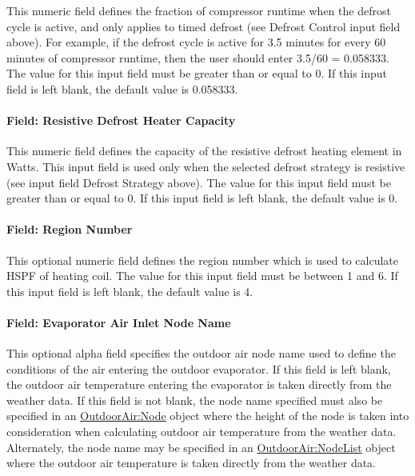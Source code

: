 This numeric field defines the fraction of compressor runtime when the defrost cycle is active, and only applies to timed defrost (see Defrost Control input field above). For example, if the defrost cycle is active for 3.5 minutes for every 60 minutes of compressor runtime, then the user should enter 3.5/60 = 0.058333. The value for this input field must be greater than or equal to 0. If this input field is left blank, the default value is 0.058333.

\paragraph{Field: Resistive Defrost Heater Capacity}\label{field-resistive-defrost-heater-capacity}

This numeric field defines the capacity of the resistive defrost heating element in Watts. This input field is used only when the selected defrost strategy is resistive (see input field Defrost Strategy above). The value for this input field must be greater than or equal to 0. If this input field is left blank, the default value is 0.

\paragraph{Field: Region Number}\label{field-region-number}

This optional numeric field defines the region number which is used to calculate HSPF of heating coil. The value for this input field must be between 1 and 6. If this input field is left blank, the default value is 4.

\paragraph{Field: Evaporator Air Inlet Node Name}\label{field-evaporator-air-inlet-node-name}

This optional alpha field specifies the outdoor air node name used to define the conditions of the air entering the outdoor evaporator. If this field is left blank, the outdoor air temperature entering the evaporator is taken directly from the weather data. If this field is not blank, the node name specified must also be specified in an \hyperref[outdoorairnode]{OutdoorAir:Node} object where the height of the node is taken into consideration when calculating outdoor air temperature from the weather data. Alternately, the node name may be specified in an \hyperref[outdoorairnodelist]{OutdoorAir:NodeList} object where the outdoor air temperature is taken directly from the weather data.

